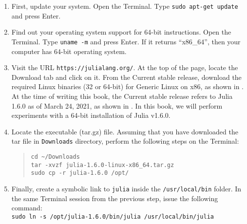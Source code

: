 \begin{enumerate}
      \item First, update your system. Open the Terminal. Type
                  {\tt sudo apt-get update} and press Enter.
      \item Find out your operating system support for 64-bit
            instructions. Open the Terminal. Type {\tt uname -m} and press Enter. If it returns ``x86\_64'', then your computer has 64-bit
            operating system.
      \item Visit the URL {\tt https://julialang.org/}.  At the top of the page,
            locate the Download tab and click on it. From the Current stable release, download the
            required Linux binaries (32 or 64-bit) for Generic Linux on x86, as shown in .
            At the time of writing this book, the Current stable release refers to Julia 1.6.0 as of March 24, 2021,
            as shown in  . In this book, we will perform experiments with a 64-bit installation of Julia  v1.6.0.
      \item Locate the executable (tar.gz) file. Assuming that you have downloaded the tar file in {\tt Downloads} directory, perform the following
            steps on the Terminal:
            \begin{quote}
                  {\tt cd {\large\textasciitilde}/Downloads\\
                        tar -xvzf julia-1.6.0-linux-x86\_64.tar.gz\\
                        sudo cp -r julia-1.6.0 /opt/}
            \end{quote}
      \item Finally, create a symbolic link to {\tt julia} inside the
                  {\tt /usr/local/bin} folder. In the same Terminal session from the previous step, issue the
            following command: \\
            {\tt sudo ln -s /opt/julia-1.6.0/bin/julia /usr/local/bin/julia}
\end{enumerate}

